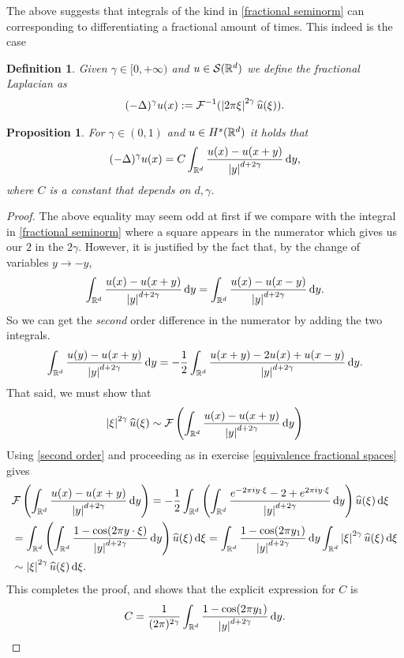 \documentclass[12pt]{article}
\newtheorem{proposition}[theorem]{Proposition}
\newtheorem{definition}[theorem]{Definition}
\theoremstyle{definition}
\renewcommand{\d}{\,\mathrm{d}}
\begin{document}
The above suggests that integrals of the kind in \eqref{fractional seminorm} can corresponding to differentiating a fractional amount of times. This indeed is the case
\begin{definition}
  Given $\gamma  \in [0,+\infty)$ and $u \in \mathcal{S} (\mathbb{R}^d)$ we define the fractional Laplacian as
  \begin{align*}
    (-\Delta )^{\gamma }u(x):= \mathcal{F}^{-1}(\left| 2\pi\xi \right|^{2\gamma }\widehat{u}(\xi )).
  \end{align*}
\end{definition}
\begin{proposition}
  For $\gamma  \in (0,1)$ and $u \in H^s(\mathbb{R}^d)$ it holds that
  \begin{align*}
    (-\Delta )^{\gamma }u(x)=C\int_{\R^d}\frac{u(x)-u(x+y)}{\abs{y}^{d+2\gamma}}\d y,
  \end{align*}
  where $C$ is a constant that depends on $d,\gamma $.
\end{proposition}
\begin{proof}
  The above equality may seem odd at first if we compare with the integral in \eqref{fractional seminorm} where a square appears in the numerator which gives us our $2$  in the $2 \gamma $. However, it is justified by the fact that, by the change of variables $y \to -y$,
  \begin{align*}
    \int_{\R^d}\frac{u(x)-u(x+y)}{\abs{y}^{d+2\gamma}}\d y=\int_{\R^d}\frac{u(x)-u(x-y)}{\abs{y}^{d+2\gamma}}\d y.
  \end{align*}
  So we can get the \emph{second} order difference in the numerator by adding the two integrals.
  \begin{align}\label{second order}
    \int_{\R^d}\frac{u(y)-u(x+y)}{\abs{y}^{d+2\gamma}}\d y=-\frac{1}{2}\int_{\R^d}\frac{u(x+y)-2u(x)+u(x-y)}{\abs{y}^{d+2\gamma}}\d y.
  \end{align}
  That said, we must show that
  \begin{align*}
    \abs{\xi}^{2\gamma }\wh{u}(\xi )\sim \Ff \left(\int_{\R^d}\frac{u(x)-u(x+y)}{\abs{y}^{d+2\gamma}}\d y\right)
  \end{align*}
  Using \eqref{second order} and proceeding as in exercise \ref{equivalence fractional spaces} gives
  \begin{align*}
     & \Ff \left(\int_{\R^d}\frac{u(x)-u(x+y)}{\abs{y}^{d+2\gamma}}\d y\right)= -\frac{1}{2} \int_{\R^d}\left(\int_{\R^d}\frac{e^{-2\pi i y \cdot \xi}-2+e^{2\pi i y \cdot \xi}}{\abs{y}^{d+2\gamma}}\d y\right) \wh{u}(\xi)\d \xi       \\
     & =\int_{\R^d}\left(\int_{\R^d}\frac{1-\cos(2\pi y \cdot \xi)}{\abs{y}^{d+2\gamma}}\d y\right) \wh{u}(\xi)\d \xi =\int_{\R^d}  \frac{1-\cos(2\pi  y_1) }{\abs{y}^{d+2\gamma	}}\d y\int_{\R^d}\abs{\xi}^{2 \gamma }\wh{u}(\xi)\d \xi \\& \sim \abs{\xi}^{2 \gamma }\wh{u}(\xi)\d \xi.
  \end{align*}
  This completes the proof, and shows that the explicit expression for $C$ is
  \begin{align*}
    C=\frac{1}{(2\pi)^{2 \gamma }}\int_{\R^d}  \frac{1-\cos(2\pi  y_1) }{\abs{y}^{d+2\gamma	}}\d y.
  \end{align*}
\end{proof}
\end{document}
